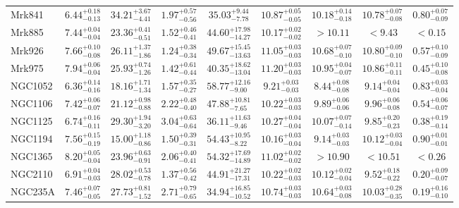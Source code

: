 \documentclass[onecolumn]{mn2e}
\begin{document}
{\begin{center}
\begin{longtable}{lcccccccc}
Mrk841 & $6.44_{-0.13}^{+0.18}$ & $34.21_{-4.41}^{+3.67}$ & $1.97_{-0.56}^{+0.57}$ &$35.03_{-7.78}^{+9.44}$ & $10.87_{-0.05}^{+0.05}$ & $10.18_{-0.18}^{+0.14}$ & $10.78_{-0.08}^{+0.07}$ & $0.80_{-0.09}^{+0.07}$ \\
Mrk885 & $7.44_{-0.04}^{+0.04}$ & $23.36_{-0.51}^{+0.41}$ & $1.52_{-0.41}^{+0.46}$ &$44.60_{-14.27}^{+17.98}$ & $10.17_{-0.02}^{+0.02}$ & $>10.11$ & $<9.43$ & $<0.15$ \\
Mrk926 & $7.66_{-0.08}^{+0.10}$ & $26.11_{-1.86}^{+1.37}$ & $1.24_{-0.34}^{+0.38}$ &$49.67_{-13.63}^{+15.45}$ & $11.05_{-0.03}^{+0.03}$ & $10.68_{-0.10}^{+0.07}$ & $10.80_{-0.10}^{+0.09}$ & $0.57_{-0.09}^{+0.10}$ \\
Mrk975 & $7.94_{-0.04}^{+0.06}$ & $25.93_{-1.26}^{+0.74}$ & $1.42_{-0.44}^{+0.61}$ &$40.35_{-13.04}^{+18.62}$ & $11.20_{-0.03}^{+0.03}$ & $10.95_{-0.07}^{+0.04}$ & $10.86_{-0.11}^{+0.11}$ & $0.45_{-0.08}^{+0.10}$ \\
NGC1052 & $6.36_{-0.16}^{+0.14}$ & $18.16_{-1.34}^{+1.71}$ & $1.57_{-0.27}^{+0.35}$ &$58.77_{-9.00}^{+12.16}$ & $9.21_{-0.03}^{+0.03}$ & $8.44_{-0.08}^{+0.08}$ & $9.14_{-0.04}^{+0.04}$ & $0.83_{-0.04}^{+0.03}$ \\
NGC1106 & $7.42_{-0.07}^{+0.06}$ & $21.12_{-0.88}^{+0.98}$ & $2.22_{-0.40}^{+0.48}$ &$47.88_{-7.65}^{+10.81}$ & $10.22_{-0.03}^{+0.03}$ & $9.89_{-0.06}^{+0.06}$ & $9.96_{-0.08}^{+0.06}$ & $0.54_{-0.07}^{+0.06}$ \\
NGC1125 & $6.74_{-0.11}^{+0.16}$ & $29.30_{-3.20}^{+1.94}$ & $3.04_{-0.64}^{+0.63}$ &$36.11_{-9.46}^{+11.63}$ & $10.27_{-0.04}^{+0.04}$ & $10.07_{-0.14}^{+0.07}$ & $9.85_{-0.23}^{+0.20}$ & $0.38_{-0.14}^{+0.19}$ \\
NGC1194 & $7.56_{-0.19}^{+0.15}$ & $15.00_{-0.86}^{+1.18}$ & $1.50_{-0.31}^{+0.39}$ &$54.43_{-8.22}^{+10.95}$ & $10.16_{-0.04}^{+0.03}$ & $9.14_{-0.03}^{+0.03}$ & $10.12_{-0.04}^{+0.03}$ & $0.90_{-0.01}^{+0.01}$ \\
NGC1365 & $8.20_{-0.04}^{+0.05}$ & $23.96_{-0.91}^{+0.63}$ & $2.06_{-0.41}^{+0.40}$ &$54.32_{-14.89}^{+17.69}$ & $11.02_{-0.02}^{+0.02}$ & $>10.90$ & $<10.51$ & $<0.26$ \\
NGC2110 & $6.91_{-0.03}^{+0.04}$ & $28.02_{-0.78}^{+0.53}$ & $1.37_{-0.42}^{+0.56}$ &$44.91_{-17.31}^{+21.27}$ & $10.22_{-0.03}^{+0.02}$ & $10.12_{-0.04}^{+0.02}$ & $9.52_{-0.22}^{+0.18}$ & $0.20_{-0.07}^{+0.09}$ \\
NGC235A & $7.46_{-0.05}^{+0.07}$ & $27.73_{-1.52}^{+0.81}$ & $2.71_{-0.65}^{+0.79}$ &$34.94_{-10.52}^{+16.85}$ & $10.74_{-0.03}^{+0.03}$ & $10.64_{-0.08}^{+0.03}$ & $10.03_{-0.35}^{+0.28}$ & $0.19_{-0.10}^{+0.16}$ \\

\end{longtable}
\end{center}}
\end{document}
